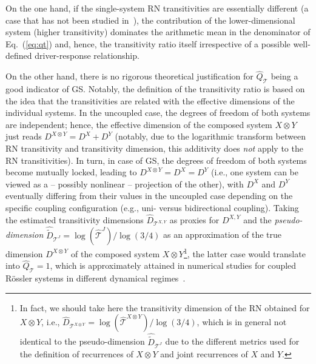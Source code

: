 \documentclass[graybox]{svmult}
\begin{document}
On the one hand, if the single-system RN transitivities are essentially different (a case that has not been studied in~\cite{Feldhoff2013}), the contribution of the lower-dimensional system (higher transitivity) dominates the arithmetic mean in the denominator of Eq.~(\ref{eq:qt}) and, hence, the transitivity ratio itself irrespective of a possible well-defined driver-response relationship. 

On the other hand, there is no rigorous theoretical justification for $\hat{Q}_{\mathcal{T}}$ being a good indicator of GS. Notably, the definition of the transitivity ratio is based on the idea that the transitivities are related with the effective dimensions of the individual systems. In the uncoupled case, the degrees of freedom of both systems are independent; hence, the effective dimension of the composed system $X\otimes Y$ just reads $D^{X\otimes Y}=D^X + D^Y$ (notably, due to the logarithmic transform between RN transitivity and transitivity dimension, this additivity does \emph{not} apply to the RN transitivities). In turn, in case of GS, the degrees of freedom of both systems become mutually locked, leading to $D^{X\otimes Y}=D^X=D^Y$ (i.e., one system can be viewed as a -- possibly nonlinear -- projection of the other), with $D^X$ and $D^Y$ eventually differing from their values in the uncoupled case depending on the specific coupling configuration (e.g., uni- versus bidirectional coupling). 
Taking the estimated transitivity dimensions $\hat{D}_{\mathcal{T}^{X,Y}}$ as proxies for $D^{X,Y}$ and the \emph{pseudo-dimension} $\hat{\tilde{D}}_{\mathcal{T}^J}=\log(\hat{\mathcal{T}}^J)/\log(3/4)$ as an approximation of the true dimension $D^{X\otimes Y}$ of the composed system $X\otimes Y$\footnote{In fact, we should take here the transitivity dimension of the RN obtained for $X\otimes Y$, i.e., $\hat{D}_{\mathcal{T}^{X\otimes Y}}=\log(\hat{\mathcal{T}}^{X\otimes Y})/\log(3/4)$, which is in general not identical to the pseudo-dimension $\hat{\tilde{D}}_{\mathcal{T}^J}$ due to the different metrics used for the definition of recurrences of $X\otimes Y$ and joint recurrences of $X$ and $Y$.}, the latter case would translate into $\hat{Q}_{\mathcal{T}}=1$, which is approximately attained in numerical studies for coupled R\"ossler systems in different dynamical regimes~\cite{Feldhoff2013}.

\end{document}
